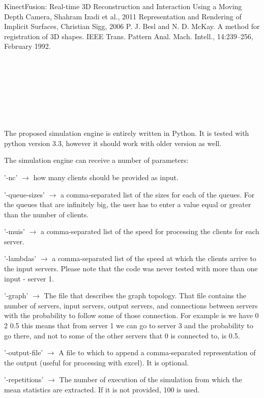 \documentclass[12pt]{article}
\newenvironment{itemize*}{
  \begin{itemize}
    \setlength{\itemsep}{0pt}
    \setlength{\parskip}{0pt}
    \setlength{\parsep}{0pt}
}{
  \end{itemize}
}
\theoremstyle{plain}
\begin{document}
\begin{thebibliography}{widest entry}
   KinectFusion: Real-time 3D Reconstruction and
    Interaction Using a Moving Depth Camera, Shahram Izadi et al., 2011
   Representation and
    Rendering of Implicit Surfaces, Christian Sigg, 2006
   P. J. Besl and N. D. McKay. A method for registration of 3D
    shapes. IEEE Trans. Pattern Anal. Mach. Intell., 14:239–256, February 1992. 
\end{thebibliography}

\hfill\\
\hfill\\
\hfill\\
\hfill\\
\hfill\\
\hfill\\
\hfill\\

The proposed simulation engine is entirely written in Python. It is tested with
python version 3.3, however it should work with older version as well.

The simulation engine can receive a number of parameters: 
\begin{itemize*}
  \item '-nc' $\rightarrow$ how many clients should be provided as input.
  \item '-queue-sizes' $\rightarrow$ a comma-separated list of the sizes for
    each of the queues. For the queues that are infinitely big, the user has to
    enter a value equal or greater than the number of clients.
  \item '-muis' $\rightarrow$ a comma-separated list of the speed for
    processing the clients for each server.
  \item '-lambdas' $ \rightarrow $ a comma-separated list of the speed at which
    the clients arrive to the input servers. Please note that the code was
    never tested with more than one input - server 1.
  \item '-graph' $ \rightarrow $ The file that describes the graph topology.
    That file contains the number of servers, input servers, output servers,
    and connections between servers with the probability to follow some of 
    those connection. For example is we have 0 2 0.5 this means that from 
    server 1 we can go to server 3 and the probability to go there, and not to
    some of the other servers that 0 is connected to, is 0.5.
  \item '-output-file' $ \rightarrow $ A file to which to append a
    comma-separated representation of the output (useful for processing with
    excel). It is optional.  
  \item '-repetitions' $ \rightarrow $ The number of execution of the simulation
    from which the mean statistics are extracted. If it is not provided, 100 is
    used.
\end{itemize*}
\end{document}
